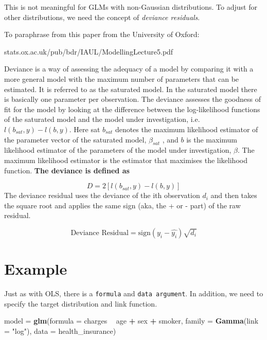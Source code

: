 \documentclass[
  openany]{book}
\newenvironment{Shaded}{\begin{snugshade}}{\end{snugshade}}
\newcommand{\DataTypeTok}[1]{\textcolor[rgb]{0.13,0.29,0.53}{#1}}
\newcommand{\KeywordTok}[1]{\textcolor[rgb]{0.13,0.29,0.53}{\textbf{#1}}}
\newcommand{\NormalTok}[1]{#1}
\newcommand{\OperatorTok}[1]{\textcolor[rgb]{0.81,0.36,0.00}{\textbf{#1}}}
\newcommand{\StringTok}[1]{\textcolor[rgb]{0.31,0.60,0.02}{#1}}
\begin{document}
This is not meaningful for GLMs with non-Gaussian distributions. To adjust for other distributions, we need the concept of \emph{deviance residuals}.

To paraphrase from this paper from the University of Oxford:

stats.ox.ac.uk/pub/bdr/IAUL/ModellingLecture5.pdf

Deviance is a way of assessing the adequacy of a model by comparing it with a more general
model with the maximum number of parameters that can be estimated. It is referred to
as the saturated model. In the saturated model there is basically one parameter per
observation. The deviance assesses the goodness of fit for the model by looking at the
difference between the log-likelihood functions of the saturated model and the model
under investigation, i.e.~\(l(b_{sat},y) - l(b,y)\). Here sat \(b_{sat}\) denotes the maximum likelihood
estimator of the parameter vector of the saturated model, \(\beta_{sat}\) , and \(b\) is the maximum
likelihood estimator of the parameters of the model under investigation, \(\beta\). The maximum likelihood estimator is the estimator that maximises the likelihood function. \textbf{The deviance is defined as}

\[D = 2[l(b_{sat},y) - l(b,y)]\]
The deviance residual uses the deviance of the ith observation \(d_i\) and then takes the square root and applies the same sign (aka, the + or - part) of the raw residual.

\[\text{Deviance Residual} = \text{sign}(y_i - \hat{y_i})\sqrt{d_i}\]

\hypertarget{example-2}{%
\section{Example}\label{example-2}}

Just as with OLS, there is a \texttt{formula} and \texttt{data\ argument}. In addition, we need to specify the target distribution and link function.

\begin{Shaded}
\begin{Highlighting}[]
\NormalTok{model =}\StringTok{ }\KeywordTok{glm}\NormalTok{(}\DataTypeTok{formula =}\NormalTok{ charges }\OperatorTok{~}\StringTok{ }\NormalTok{age }\OperatorTok{+}\StringTok{ }\NormalTok{sex }\OperatorTok{+}\StringTok{ }\NormalTok{smoker, }
            \DataTypeTok{family =} \KeywordTok{Gamma}\NormalTok{(}\DataTypeTok{link =} \StringTok{"log"}\NormalTok{),}
            \DataTypeTok{data =}\NormalTok{ health_insurance)}
\end{Highlighting}
\end{Shaded}
\end{document}
